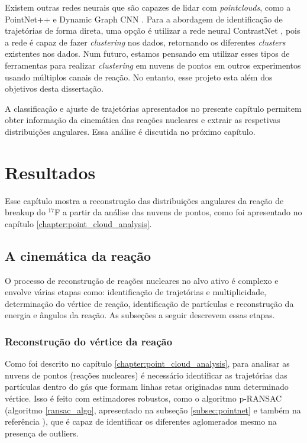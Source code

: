 \documentclass[a4paper,12pt,oneside]{book}
\begin{document}
\par Existem outras redes neurais que são capazes de lidar com \textit{pointclouds}, como a PointNet++ \cite{qi2017pointnetplusplus} e Dynamic Graph CNN \cite{graph_cnn}. Para a abordagem de identificação de trajetórias de forma direta, uma opção é utilizar a rede neural ContrastNet \cite{contrastnet}, pois a rede é capaz de fazer \textit{clustering} nos dados, retornando os diferentes \textit{clusters} existentes nos dados. Num futuro, estamos pensando em utilizar esses tipos de ferramentas para realizar \textit{clustering} em nuvens de pontos em outros experimentos usando múltiplos canais de reação. No entanto, esse projeto esta além dos objetivos desta dissertação.

\par A classificação e ajuste de trajetórias apresentados no presente capítulo permitem obter informação da cinemática das reações nucleares e extrair as respetivas distribuições angulares. Essa análise é discutida no próximo capítulo.

\chapter{Resultados}\label{chapter:resultados}

\par Esse capítulo mostra a reconstrução das distribuições angulares da reação de breakup do $^{17}$F a partir da análise das nuvens de pontos, como foi apresentado no capítulo \ref{chapter:point_cloud_analysis}.

\section{A cinemática da reação}\label{sec:identif_reac_nucl}

\par O processo de reconstrução de reações nucleares no alvo ativo é complexo e envolve várias etapas como: identificação de trajetórias e multiplicidade, determinação do vértice de reação, identificação de partículas e reconstrução da energia e ângulos da reação. As subseções a seguir descrevem essas etapas.

\subsection{Reconstrução do vértice da reação}

\par Como foi descrito no capítulo \ref{chapter:point_cloud_analysis}, para analisar as nuvens de pontos (reações nucleares) é necessário identificar as trajetórias das partículas dentro do gás que formam linhas retas originadas num determinado vértice. Isso é feito com estimadores robustos, como o algoritmo p-RANSAC (algoritmo \ref{ransac_algo}, apresentado na subseção \ref{subsec:pointnet} e também na referência \cite{artigo}), que é capaz de identificar os diferentes aglomerados mesmo na presença de outliers.
\end{document}
